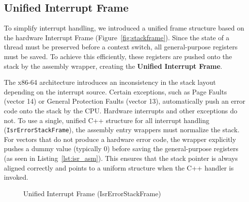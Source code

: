 \documentclass[a4paper,10pt,twoside]{report}
\theoremstyle{definition}
\begin{document}
\subsection{Unified Interrupt Frame}
\label{subsec:unifiedFrame}

To simplify interrupt handling, we introduced a unified frame structure based on the hardware Interrupt Frame (Figure~\ref{fig:stackframe}). Since the state of a thread must be preserved before a context switch, all general-purpose registers must be saved. To achieve this efficiently, these registers are pushed onto the stack by the assembly wrapper, creating the \textbf{Unified Interrupt Frame}.

The x86-64 architecture introduces an inconsistency in the stack layout depending on the interrupt source. Certain exceptions, such as Page Faults (vector 14) or General Protection Faults (vector 13), automatically push an error code onto the stack by the CPU. Hardware interrupts and other exceptions do not. To use a single, unified C++ structure for all interrupt handling (\texttt{IsrErrorStackFrame}), the assembly entry wrappers must normalize the stack. For vectors that do not produce a hardware error code, the wrapper explicitly pushes a dummy value (typically 0) before saving the general-purpose registers (as seen in Listing~\ref{lst:isr_asm}). This ensures that the stack pointer is always aligned correctly and points to a uniform structure when the C++ handler is invoked.

\begin{figure}[htbp]
  \centering
  \caption{Unified Interrupt Frame (IsrErrorStackFrame)}
  \label{fig:unifiedstackframe}
\end{figure}
\end{document}
